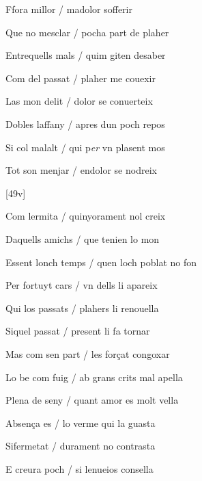 \begin{estrofa}

 Ffora millor / madolor sofferir

 Que no mesclar / pocha part de plaher

 Entrequells mals / quim giten desaber

 Com del passat / plaher me couexir

 Las mon delit / dolor se conuerteix

 Dobles laffany / apres dun poch repos

 Si col malalt / qui p\textit{er} vn plasent mos

 Tot son menjar / endolor se nodreix

\end{estrofa}


[49v]
\begin{estrofa}

 Com lermita / quinyorament nol creix

 Daquells amichs / que tenien lo mon

 Essent lonch temps / quen loch poblat no fon

 Per fortuyt cars / vn dells li apareix

 Qui los passats / plahers li renouella

 Siquel passat / present li fa tornar

 Mas com sen part / les for\c{c}at congoxar

 Lo be com fuig / ab grans crits mal apella

\end{estrofa}



\begin{tornada}

 Plena de seny / quant amor es molt vella

 Absen\c{c}a es / lo verme qui la guasta

 Sifermetat / durament no contrasta

 E creura poch / si lenueios consella

\end{tornada}





